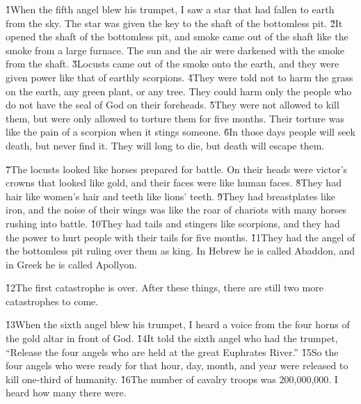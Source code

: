 \v{1}When the fifth angel blew his trumpet, I saw a star that had fallen to earth from the sky. The star was given the key to the shaft of the bottomless pit. \v{2}It opened the shaft of the bottomless pit, and smoke came out of the shaft like the smoke from a large furnace. The sun and the air were darkened with the smoke from the shaft. \v{3}Locusts came out of the smoke onto the earth, and they were given power like that of earthly scorpions. \v{4}They were told not to harm the grass on the earth, any green plant, or any tree. They could harm only the people who do not have the seal of God on their foreheads. \v{5}They were not allowed to kill them, but were only allowed to torture them for five months. Their torture was like the pain of a scorpion when it stings someone. \v{6}In those days people will seek death, but never find it. They will long to die, but death will escape them.

\v{7}The locusts looked like horses prepared for battle. On their heads were victor's crowns that looked like gold, and their faces were like human faces. \v{8}They had hair like women's hair and teeth like lions' teeth. \v{9}They had breastplates like iron, and the noise of their wings was like the roar of chariots with many horses rushing into battle. \v{10}They had tails and stingers like scorpions, and they had the power to hurt people with their tails for five months. \v{11}They had the angel of the bottomless pit ruling over them as king. In Hebrew he is called Abaddon, and in Greek he is called Apollyon.

\v{12}The first catastrophe is over. After these things, there are still two more catastrophes to come.

\v{13}When the sixth angel blew his trumpet, I heard a voice from the four horns of the gold altar in front of God. \v{14}It told the sixth angel who had the trumpet, ``Release the four angels who are held at the great Euphrates River.'' \v{15}So the four angels who were ready for that hour, day, month, and year were released to kill one-third of humanity. \v{16}The number of cavalry troops was 200,000,000. I heard how many there were.

